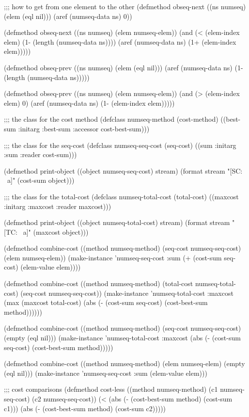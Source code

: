 ;;; how to get from one element to the other
(defmethod obseq-next ((ns numseq) (elem (eql nil)))
  (aref (numseq-data ns) 0))

(defmethod obseq-next ((ns numseq) (elem numseq-elem))
  (and (< (elem-index elem) (1- (length (numseq-data ns))))
       (aref (numseq-data ns) (1+ (elem-index elem)))))

(defmethod obseq-prev ((ns numseq) (elem (eql nil)))
  (aref (numseq-data ns) (1- (length (numseq-data ns)))))

(defmethod obseq-prev ((ns numseq) (elem numseq-elem))
  (and (> (elem-index elem) 0)
       (aref (numseq-data ns) (1- (elem-index elem)))))

;;; the class for the cost method
(defclass numseq-method (cost-method)
  ((best-sum :initarg :best-sum :accessor cost-best-sum)))

;;; the class for the seq-cost
(defclass numseq-seq-cost (seq-cost)
  ((sum :initarg :sum :reader cost-sum)))

(defmethod print-object ((object numseq-seq-cost) stream)
  (format stream "[SC: ~a]" (cost-sum object)))

;;; the class for the total-cost
(defclass numseq-total-cost (total-cost)
  ((maxcost :initarg :maxcost :reader maxcost)))

(defmethod print-object ((object numseq-total-cost) stream)
  (format stream "[TC: ~a]" (maxcost object)))

(defmethod combine-cost ((method numseq-method)
			 (seq-cost numseq-seq-cost)
			 (elem numseq-elem))
  (make-instance 'numseq-seq-cost :sum (+ (cost-sum seq-cost) (elem-value elem))))

(defmethod combine-cost ((method numseq-method)
			 (total-cost numseq-total-cost)
			 (seq-cost numseq-seq-cost))
  (make-instance 'numseq-total-cost
    :maxcost (max (maxcost total-cost)
		  (abs (- (cost-sum seq-cost) (cost-best-sum method))))))

(defmethod combine-cost ((method numseq-method)
			 (seq-cost numseq-seq-cost)
			 (empty (eql nil)))
  (make-instance 'numseq-total-cost
    :maxcost (abs (- (cost-sum seq-cost) (cost-best-sum method)))))

(defmethod combine-cost ((method numseq-method) (elem numseq-elem) (empty (eql nil)))
  (make-instance 'numseq-seq-cost :sum (elem-value elem)))

;;; cost comparisons 
(defmethod cost-less ((method numseq-method)
		      (c1 numseq-seq-cost)
		      (c2 numseq-seq-cost))
  (< (abs (- (cost-best-sum method)
	     (cost-sum c1)))
     (abs (- (cost-best-sum method)
	     (cost-sum c2)))))



